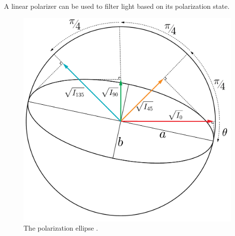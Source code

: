 A linear polarizer can be used to filter light based on its polarization state.

\begin{minipage}{.5\textwidth}
    \begin{figure}[H]
        \centering
        \includegraphics[width=\textwidth]{figures/polarization_sketch.pdf}
        \caption{The polarization ellipse \cite{inductiveloadPolarisation_ellipse22008}.}
        \label{fig:polarization_naming}
    \end{figure}
\end{minipage}
